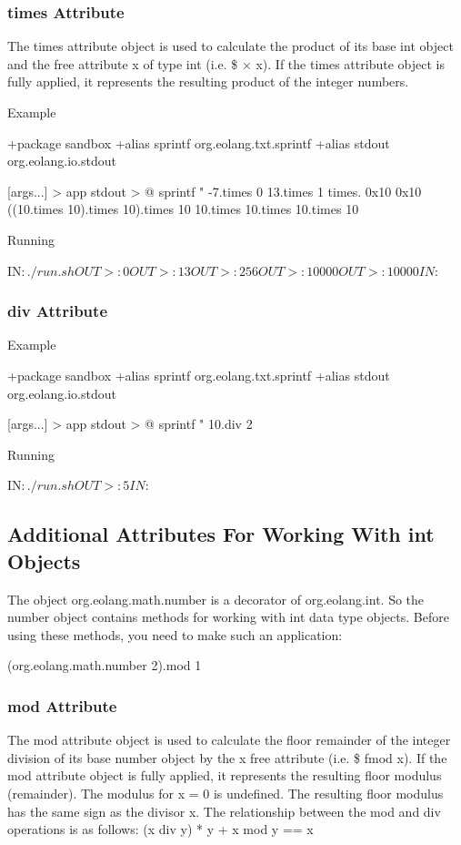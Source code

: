 \documentclass[12pt]{book}
\begin{document}
\subsubsection{times Attribute}
The times attribute object is used to calculate the product of its base int object and the free attribute x of type int (i.e. \$ × x).
If the times attribute object is fully applied, it represents the resulting product of the integer numbers.

Example
\begin{ffcode}
+package sandbox
+alias sprintf org.eolang.txt.sprintf
+alias stdout org.eolang.io.stdout

[args...] > app
  stdout > @
    sprintf
      "%
      -7.times 0
      13.times 1
      times.
        0x10
        0x10
      ((10.times 10).times 10).times 10
      10.times 10.times 10.times 10

Running

IN$: ./run.sh
OUT>: 0
OUT>: 13
OUT>: 256
OUT>: 10000
OUT>: 10000
IN$: 
\end{ffcode}

\subsubsection{div Attribute}
Example
\begin{ffcode}
+package sandbox
+alias sprintf org.eolang.txt.sprintf
+alias stdout org.eolang.io.stdout

[args...] > app
  stdout > @
    sprintf
      "%
      10.div 2

Running

IN$: ./run.sh
OUT>: 5
IN$: 
\end{ffcode}

\subsection{Additional Attributes For Working With int Objects}
The object org.eolang.math.number is a decorator of org.eolang.int. So the number object contains methods for working with int data type objects. Before using these methods, you need to make such an application:
\begin{ffcode}
(org.eolang.math.number 2).mod 1
\end{ffcode}

\subsubsection{mod Attribute}
The mod attribute object is used to calculate the floor remainder of the integer division of its base number object by the x free attribute (i.e. \$ fmod x).
If the mod attribute object is fully applied, it represents the resulting floor modulus (remainder).
The modulus for x = 0 is undefined. The resulting floor modulus has the same sign as the divisor x.
The relationship between the mod and div operations is as follows:
(x div y) * y + x mod y == x
\end{document}
